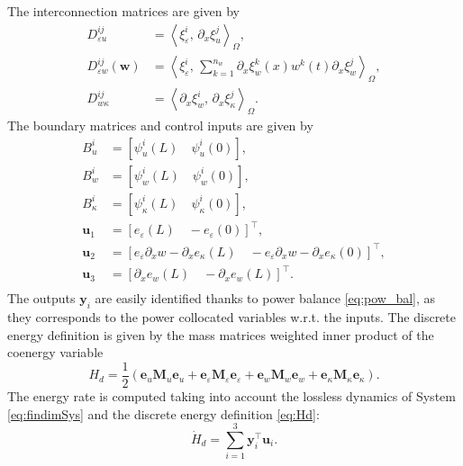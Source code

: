 \documentclass{ifacconf}
\newcommand{\inner}[3][]{\ensuremath{\left\langle #2, \, #3 \right\rangle_{#1}}}
\begin{document}
The interconnection matrices are given by 
\begin{equation}
	\begin{aligned}
	D_{\varepsilon u}^{ij} &= \inner[\Omega]{\xi_\varepsilon^i}{\partial_x \xi_u^j}, \\
	D_{\varepsilon w}^{ij}(\mathbf{w}) &= \inner[\Omega]{\xi_\varepsilon^i}{ \sum_{k=1}^{n_w} \partial_x \xi_w^k(x) w^k(t) \partial_x \xi_w^j}, \\
	D_{w \kappa}^{ij} &= \inner[\Omega]{\partial_x \xi_w^i}{\partial_x \xi_\kappa^j}.
	\end{aligned}
\end{equation}
The boundary matrices and control inputs are given by
\begin{equation}
	\begin{aligned}
		B_u^{i} &= [\psi_u^i(L) \quad \psi_u^i(0)], \\
		B_w^{i} &= [\psi_w^i(L) \quad \psi_w^i(0)], \\
		B_{\kappa}^{i} &= [\psi_{\kappa}^i(L) \quad \psi_{\kappa}^i(0)], \\
		\mathbf{u}_1 &= [e_\varepsilon(L) \quad -e_\varepsilon(0)]^\top, \\
		\mathbf{u}_2 &= [e_\varepsilon\partial_x w - \partial_x e_\kappa(L) \quad -e_\varepsilon\partial_x w - \partial_x e_\kappa(0)]^\top, \\
		\mathbf{u}_3 &= [\partial_x e_w(L) \quad -\partial_x e_w(L)]^\top. \\	
		\end{aligned}
\end{equation}
The outputs $\mathbf{y}_i$ are easily identified thanks to power balance \eqref{eq:pow_bal}, as they corresponds to the power collocated variables w.r.t. the inputs. The discrete energy definition is given by the mass matrices weighted inner product of the coenergy variable
\begin{equation}\label{eq:Hd}
	H_d = \frac{1}{2}(\mathbf{e}_u \mathbf{M}_u \mathbf{e}_u + \mathbf{e}_\varepsilon \mathbf{M}_\varepsilon \mathbf{e}_\varepsilon + \mathbf{e}_w \mathbf{M}_w \mathbf{e}_w + \mathbf{e}_\kappa \mathbf{M}_\kappa \mathbf{e}_\kappa).
\end{equation}
 The energy rate is computed taking into account the lossless dynamics of System \eqref{eq:findimSys} and the discrete energy definition \eqref{eq:Hd}:
\begin{equation}
	\dot{H}_d = \sum_{i=1}^3\mathbf{y}_i^\top \mathbf{u}_i.
\end{equation}
\end{document}
